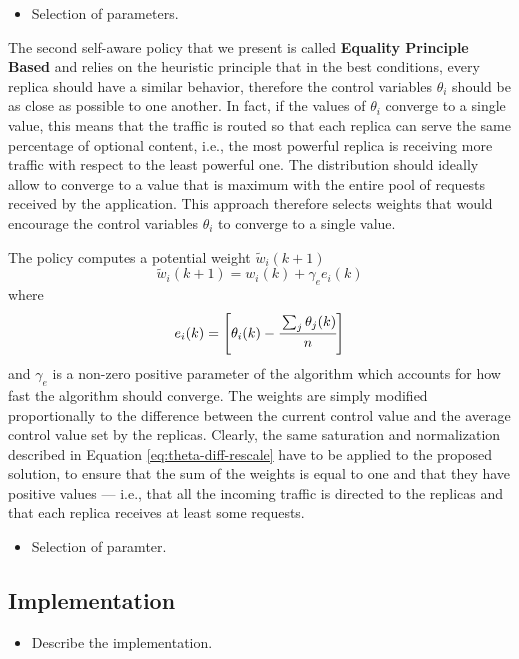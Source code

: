 \begin{itemize}
\item Selection of parameters.
\end{itemize}

The second self-aware policy that we present is called
\textbf{Equality Principle Based} and relies on the heuristic
principle that in the best conditions, every replica should have a
similar behavior, therefore the control variables $\theta_i$ should be
as close as possible to one another. In fact, if the values of
$\theta_i$ converge to a single value, this means that the traffic is
routed so that each replica can serve the same percentage of optional
content, i.e., the most powerful replica is receiving more traffic
with respect to the least powerful one. The distribution should
ideally allow to converge to a value that is maximum with the entire
pool of requests received by the application. This approach therefore
selects weights that would encourage the control variables $\theta_i$
to converge to a single value.

The policy computes a potential weight $\tilde{w}_i(k+1)$
\begin{equation}
  \tilde{w}_i(k+1) = w_i(k) + \gamma_e e_i(k)
\label{eq:equal-thetas}
\end{equation}
where
$$e_i(k)=\left[ \theta_i (k) - \cfrac{\sum_j \theta_j (k) }{n} \right]$$
and $\gamma_e$ is a non-zero positive parameter of the algorithm which
accounts for how fast the algorithm should converge. The weights are
simply modified proportionally to the difference between the current
control value and the average control value set by the
replicas. Clearly, the same saturation and normalization described in
Equation \eqref{eq:theta-diff-rescale} have to be applied to the
proposed solution, to ensure that the sum of the weights is equal to
one and that they have positive values --- i.e., that all the incoming
traffic is directed to the replicas and that each replica receives at
least some requests.

\begin{itemize}
\item Selection of paramter.
\end{itemize}

\subsection{Implementation}

\begin{itemize}
\item Describe the implementation.
\end{itemize}